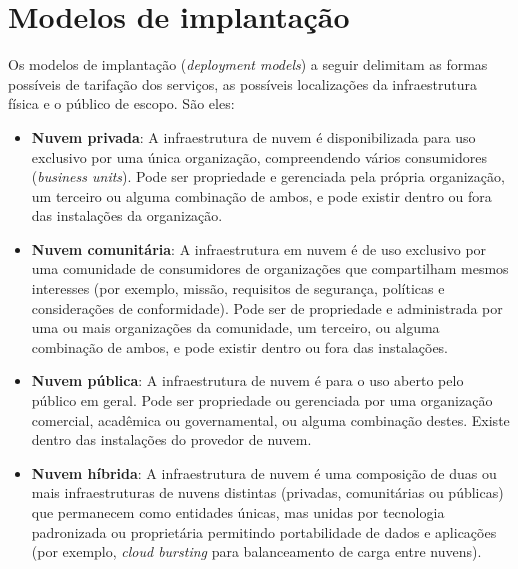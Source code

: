 \section{Modelos de implantação}
Os modelos de implantação (\textit{deployment models}) a seguir delimitam as formas possíveis de tarifação dos serviços, as possíveis localizações da infraestrutura física e o público de escopo. São eles:

\begin{itemize}
  \item \textbf{Nuvem privada}: A infraestrutura de nuvem é disponibilizada para uso exclusivo por uma única organização, compreendendo vários consumidores (\textit{business units}). Pode ser propriedade e gerenciada pela própria organização, um terceiro ou alguma combinação de ambos, e pode existir dentro ou fora das instalações da organização.
  \item \textbf{Nuvem comunitária}: A infraestrutura em nuvem é de uso exclusivo por uma comunidade de consumidores de organizações que compartilham mesmos interesses (por exemplo, missão, requisitos de segurança, políticas e considerações de conformidade). Pode ser de propriedade e administrada por uma ou mais organizações da comunidade, um terceiro, ou alguma combinação de ambos, e pode existir dentro ou fora das instalações.
  \item \textbf{Nuvem pública}: A infraestrutura de nuvem é para o uso aberto pelo público em geral. Pode ser propriedade ou gerenciada por uma organização comercial, acadêmica ou governamental, ou alguma combinação destes. Existe dentro das instalações do provedor de nuvem.
  \item \textbf{Nuvem híbrida}: A infraestrutura de nuvem é uma composição de duas ou mais infraestruturas de nuvens distintas (privadas, comunitárias ou públicas) que permanecem como entidades únicas, mas unidas por tecnologia padronizada ou proprietária permitindo portabilidade de dados e aplicações (por exemplo, \textit{cloud bursting} para balanceamento de carga entre nuvens).
\end{itemize}
